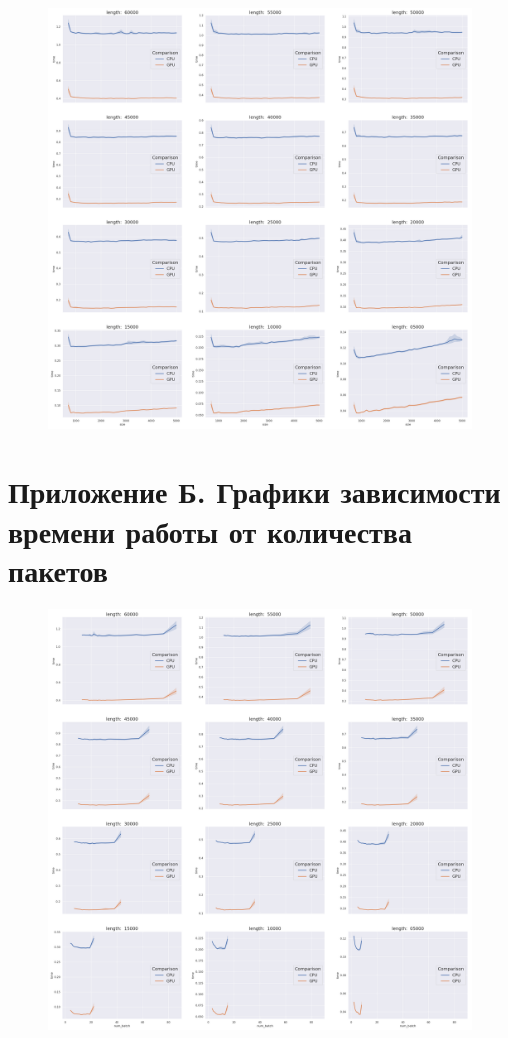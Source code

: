 \begin{figure}[h]
\centering
\includegraphics[width=\textwidth]{img/len_CPU_vs_GPU_Grid}
\end{figure}

\newpage
\section*{Приложение Б. Графики зависимости времени работы от количества пакетов}
\label{sec:num}

\begin{figure}[h]
\centering
\includegraphics[width=\textwidth]{img/num_CPU_vs_GPU_Grid}
\end{figure}

